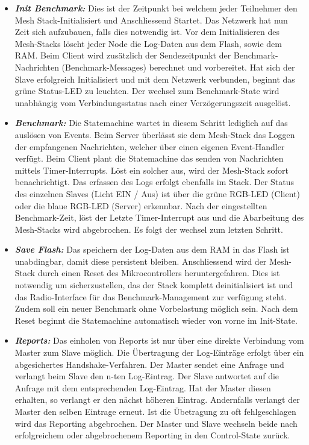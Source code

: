 \begin{itemize}
	\item \textbf{\textit{Init Benchmark:}} Dies ist der Zeitpunkt bei welchem jeder Teilnehmer den Mesh Stack-Initialisiert und Anschliessend Startet. Das Netzwerk hat nun Zeit sich aufzubauen, falls dies notwendig ist. Vor dem Initialisieren des Mesh-Stacks löscht jeder Node die Log-Daten aus dem Flash, sowie dem RAM. Beim Client wird zusätzlich der Sendezeitpunkt der Benchmark-Nachrichten (Benchmark-Messages) berechnet und vorbereitet. Hat sich der Slave erfolgreich Initialisiert und mit dem Netzwerk verbunden, beginnt das grüne Status-LED zu leuchten. Der wechsel zum Benchmark-State wird unabhängig vom Verbindungsstatus nach einer Verzögerungszeit ausgelöst. 
	\item \textbf{\textit{Benchmark:}} Die Statemachine wartet in diesem Schritt lediglich auf das auslösen von Events. Beim Server überlässt sie dem Mesh-Stack das Loggen der empfangenen Nachrichten, welcher über einen eigenen Event-Handler verfügt. Beim Client plant die Statemachine das senden von Nachrichten mittels Timer-Interrupts. Löst ein solcher aus, wird der Mesh-Stack sofort benachrichtigt. Das erfassen des Logs erfolgt ebenfalls im Stack. Der Status des einzelnen Slaves (Licht EIN / Aus) ist über die grüne RGB-LED (Client) oder die blaue RGB-LED (Server) erkennbar. Nach der eingestellten Benchmark-Zeit, löst der Letzte Timer-Interrupt aus und die Abarbeitung des Mesh-Stacks wird abgebrochen. Es folgt der wechsel zum letzten Schritt. 
	\item  \textbf{\textit{Save Flash:}} Das speichern der Log-Daten aus dem RAM in das Flash ist unabdingbar, damit diese persistent bleiben. Anschliessend wird der Mesh-Stack durch einen Reset des Mikrocontrollers heruntergefahren. Dies ist notwendig um sicherzustellen, das der Stack komplett deinitialisiert ist und das Radio-Interface für das Benchmark-Management zur verfügung steht. Zudem soll ein neuer Benchmark ohne Vorbelastung möglich sein. Nach dem Reset beginnt die Statemachine automatisch wieder von vorne im Init-State. 
	\item  \textbf{\textit{Reports:}} Das einholen von Reports ist nur über eine direkte Verbindung vom Master zum Slave möglich. Die Übertragung der Log-Einträge erfolgt über ein abgesichertes Handshake-Verfahren. Der Master sendet eine Anfrage und verlangt beim Slave den n-ten Log-Eintrag. Der Slave antwortet auf die Anfrage mit dem entsprechenden Log-Eintrag. Hat der Master diesen erhalten, so verlangt er den nächst höheren Eintrag. Andernfalls verlangt der Master den selben Eintrage erneut. Ist die Übetragung zu oft fehlgeschlagen wird das Reporting abgebrochen. Der Master und Slave wechseln beide nach erfolgreichem oder abgebrochenem Reporting in den Control-State zurück.  
\end{itemize}

